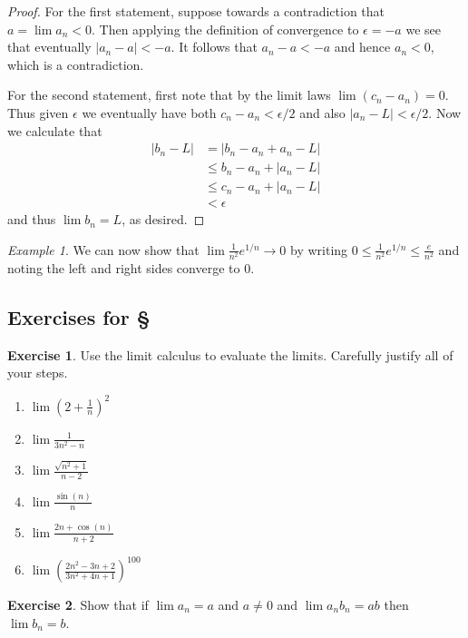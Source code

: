 \documentclass[11pt,oneside]{amsbook}
\theoremstyle{definition}
\newtheorem{exerc}{Exercise}[section]
\theoremstyle{plain}
\theoremstyle{definition}
\theoremstyle{remark}
\newtheorem{example}[thm]{Example}
\numberwithin{equation}{section}
\numberwithin{figure}{section}
\begin{document}
\begin{proof}
  For the first statement, suppose towards a contradiction that $a=\lim a_n<0$. Then applying the definition of convergence to $\epsilon=-a$ we see that eventually $|a_n-a|<-a$. It follows that $a_n-a<-a$ and hence $a_n<0$, which is a contradiction.

  For the second statement, first note that by the limit laws $\lim(c_n-a_n)=0$. Thus given $\epsilon$ we eventually have both $c_n-a_n<\epsilon/2$ and also $|a_n-L|<\epsilon/2$. Now we calculate that
  \begin{align*}
    |b_n-L|&=|b_n-a_n+a_n-L|\\
    &\leq b_n-a_n+|a_n-L|\\
    &\leq c_n-a_n+|a_n-L|\\
    &<\epsilon
  \end{align*}
  and thus $\lim b_n=L$, as desired.
\end{proof}

\begin{example}
  We can now show that $\lim\frac{1}{n^2}e^{1/n}\to0$ by writing $0\leq\frac{1}{n^2}e^{1/n}\leq\frac{e}{n^2}$ and noting the left and right sides converge to $0$.
\end{example}

\newpage
\subsection*{Exercises for \S \thesection}

\begin{exerc}
  Use the limit calculus to evaluate the limits.  Carefully justify all of your steps.
  \begin{enumerate}
    \item $\lim(2+\frac1n)^2$
    \item $\lim\frac{1}{3n^2-n}$
    \item $\lim\frac{\sqrt{n^2+1}}{n-2}$
    \item $\lim\frac{\sin(n)}{n}$
    \item $\lim\frac{2n+\cos(n)}{n+2}$
    \item $\lim\left(\frac{2n^2-3n+2}{3n^2+4n+1}\right)^{100}$
  \end{enumerate}
\end{exerc}
  
\begin{exerc}
  Show that if $\lim a_n=a$ and $a\neq0$ and $\lim a_nb_n=ab$ then $\lim b_n=b$.
\end{exerc}
\end{document}
